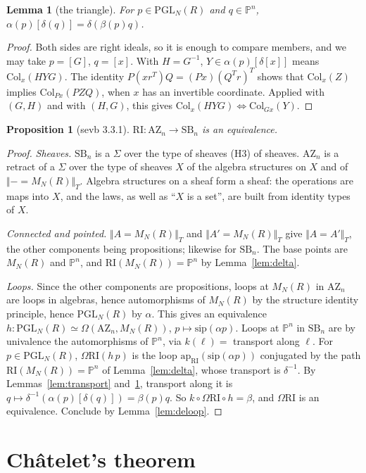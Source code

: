 \documentclass[11pt]{amsart}
\newtheorem{lemma}[theorem]{Lemma}
\newtheorem{proposition}[theorem]{Proposition}
\theoremstyle{definition}
\theoremstyle{remark}
\newcommand{\Pn}{\mathbb{P}^n}
\newcommand{\M}{M_N(R)}
\newcommand{\AZ}{\mathrm{AZ}_n}
\newcommand{\SB}{\mathrm{SB}_n}
\newcommand{\RI}{\mathrm{RI}}
\newcommand{\PGL}{\mathrm{PGL}_N(R)}
\newcommand{\trT}[1]{\Vert #1\Vert_T}
\newcommand{\Col}{\mathrm{Col}}
\begin{document}
\begin{lemma}[the triangle]\label{lem:triangle}
For $p\in\PGL$ and $q\in\Pn$, $\alpha(p)[\delta(q)]=\delta(\beta(p)q)$.
\end{lemma}
\begin{proof}
Both sides are right ideals, so it is enough to compare members, and we may
take $p=[G]$, $q=[x]$. With $H=G^{-1}$, $Y\in\alpha(p)[\delta[x]]$ means
$\Col_x(HYG)$. The identity $P(xr^T)Q=(Px)(Q^Tr)^T$ shows that $\Col_x(Z)$
implies $\Col_{Px}(PZQ)$, when $x$ has an invertible coordinate. Applied with $(G,H)$ and with $(H,G)$, this gives
$\Col_x(HYG)\iff\Col_{Gx}(Y)$.
\end{proof}

\begin{proposition}[sevb 3.3.1]\label{prop:331}
$\RI:\AZ\to\SB$ is an equivalence.
\end{proposition}
\begin{proof}
\emph{Sheaves.} $\SB$ is a $\Sigma$ over the type of sheaves (H3) of
sheaves. $\AZ$ is a retract of a $\Sigma$ over the type of sheaves $X$ of
the algebra structures on $X$ and of $\trT{-=\M}$. Algebra structures on a
sheaf form a sheaf: the operations are maps into $X$, and the laws, as
well as ``$X$ is a set'', are built from identity types of $X$.

\emph{Connected and pointed.} $\trT{A=\M}$ and $\trT{A'=\M}$ give
$\trT{A=A'}$, the other components being propositions; likewise for $\SB$.
The base points are $\M$ and $\Pn$, and $\RI(\M)=\Pn$ by
Lemma~\ref{lem:delta}.

\emph{Loops.} Since the other components are propositions, loops at $\M$
in $\AZ$ are loops in algebras, hence automorphisms of $\M$ by the
structure identity principle, hence $\PGL$ by $\alpha$. This gives an
equivalence $h:\PGL\simeq\Omega(\AZ,\M)$, $p\mapsto\mathrm{sip}(\alpha p)$.
Loops at $\Pn$ in $\SB$ are by univalence the automorphisms of $\Pn$, via
$k(\ell)=$ transport along $\ell$. For $p\in\PGL$, $\Omega\RI(h\,p)$ is the loop
$\mathrm{ap}_{\RI}(\mathrm{sip}(\alpha p))$ conjugated by the path
$\RI(\M)=\Pn$ of Lemma~\ref{lem:delta}, whose transport is $\delta^{-1}$. By
Lemmas~\ref{lem:transport} and~\ref{lem:triangle}, transport along it is
$q\mapsto\delta^{-1}(\alpha(p)[\delta(q)])=\beta(p)q$. So
$k\circ\Omega\RI\circ h=\beta$, and $\Omega\RI$ is an equivalence. Conclude
by Lemma~\ref{lem:deloop}.
\end{proof}

\section{Ch\^atelet's theorem}
\end{document}
